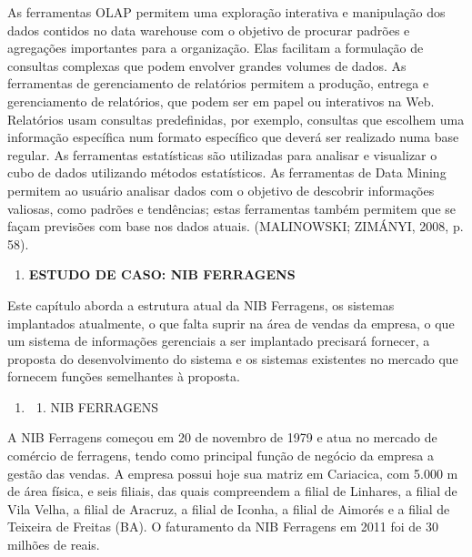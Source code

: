 \documentclass[a4paper]{article}
\newcounter{saveenum}
\newcommand\liststyleWWviiiNumi{%
\renewcommand\theenumi{\arabic{enumi}}
\renewcommand\theenumii{\arabic{enumi}.\arabic{enumii}}
\renewcommand\theenumiii{\arabic{enumi}.\arabic{enumii}.\arabic{enumiii}}
\renewcommand\theenumiv{\arabic{enumi}.\arabic{enumii}.\arabic{enumiii}.\arabic{enumiv}}
\renewcommand\labelenumi{\theenumi}
\renewcommand\labelenumii{\theenumii}
\renewcommand\labelenumiii{\theenumiii}
\renewcommand\labelenumiv{\theenumiv.}
}
\begin{document}
{
\textsf{As ferramentas OLAP permitem uma explora\c{c}\~ao interativa e manipula\c{c}\~ao dos dados contidos no data
warehouse com o objetivo de procurar padr\~oes e agrega\c{c}\~oes importantes para a organiza\c{c}\~ao. Elas facilitam
a formula\c{c}\~ao de consultas complexas que podem envolver grandes volumes de dados. As ferramentas de gerenciamento
de relat\'orios permitem a produ\c{c}\~ao, entrega e gerenciamento de relat\'orios, que podem ser em papel ou
interativos na Web. Relat\'orios usam consultas predefinidas, por exemplo, consultas que escolhem uma informa\c{c}\~ao
espec\'ifica num formato espec\'ifico que dever\'a ser realizado numa base regular. As ferramentas estat\'isticas s\~ao
utilizadas para analisar e visualizar o cubo de dados utilizando m\'etodos estat\'isticos. As ferramentas de Data
Mining permitem ao usu\'ario analisar dados com o objetivo de descobrir informa\c{c}\~oes valiosas, como padr\~oes e
tend\^encias; estas ferramentas tamb\'em permitem que se fa\c{c}am previs\~oes com base nos dados atuais. (MALINOWSKI;
ZIM\'ANYI, 2008, p. 58).}}


\bigskip

\liststyleWWviiiNumi
\setcounter{saveenum}{\value{enumi}}
\begin{enumerate}
\setcounter{enumi}{\value{saveenum}}
\item {
\textsf{\textbf{ESTUDO DE CASO: NIB FERRAGENS}}}
\end{enumerate}

\bigskip

{\sffamily
Este cap\'itulo aborda a estrutura atual da NIB Ferragens, os sistemas implantados atualmente, o que falta suprir na
\'area de vendas da empresa, o que um sistema de informa\c{c}\~oes gerenciais a ser implantado precisar\'a fornecer, a
proposta do desenvolvimento do sistema e os sistemas existentes no mercado que fornecem fun\c{c}\~oes semelhantes \`a
proposta. }


\bigskip

\liststyleWWviiiNumi
\setcounter{saveenum}{\value{enumi}}
\begin{enumerate}
\setcounter{enumi}{\value{saveenum}}
\item \setcounter{saveenum}{\value{enumii}}
\begin{enumerate}
\setcounter{enumii}{\value{saveenum}}
\item {\sffamily
NIB FERRAGENS}
\end{enumerate}
\end{enumerate}
{
\textsf{A NIB Ferragens come\c{c}ou em 20 de novembro de 1979 e atua no mercado de com\'ercio de ferragens, tendo como
principal fun\c{c}\~ao de neg\'ocio da empresa a gest\~ao das vendas. A empresa possui hoje sua matriz em Cariacica,
com 5.000 m{\texttwosuperior} de \'area f\'isica, e seis filiais, das quais compreendem a filial de Linhares, a filial
de Vila Velha, a filial de Aracruz, a filial de Iconha, a filial de Aimor\'es e a filial de Teixeira de Freitas (BA). O
faturamento da NIB Ferragens em 2011 foi de 30 milh\~oes de reais.}}
\end{document}

